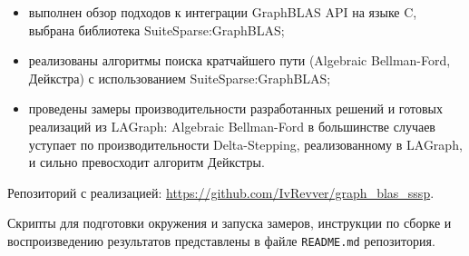 \documentclass[a4paper]{article}
\begin{document}
\begin{itemize}
    \item выполнен обзор подходов к интеграции GraphBLAS API на языке C, выбрана библиотека SuiteSparse:GraphBLAS;
    \item реализованы алгоритмы поиска кратчайшего пути (Algebraic Bellman-Ford, Дейкстра) с использованием SuiteSparse:GraphBLAS;
    \item проведены замеры производительности разработанных решений и готовых реализаций из LAGraph: Algebraic Bellman-Ford в большинстве случаев уступает по производительности Delta-Stepping, реализованному в LAGraph, и сильно превосходит алгоритм Дейкстры.
\end{itemize}

Репозиторий с реализацией: \url{https://github.com/IvRevver/graph_blas_sssp}.

Скрипты для подготовки окружения и запуска замеров, инструкции по сборке и воспроизведению результатов представлены в файле \texttt{README.md} репозитория.
\end{document}
